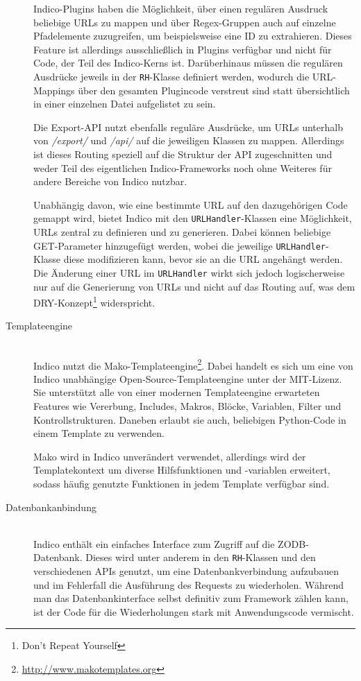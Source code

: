 \begin{description}
Indico-Plugins haben die Möglichkeit, über einen regulären Ausdruck beliebige URLs zu mappen und
über Regex-Gruppen auch auf einzelne Pfadelemente zuzugreifen, um beispielsweise eine ID zu
extrahieren. Dieses Feature ist allerdings ausschließlich in Plugins verfügbar und nicht für Code,
der Teil des Indico-Kerns ist. Darüberhinaus müssen die regulären Ausdrücke jeweils in der
\lstinline{RH}-Klasse definiert werden, wodurch die URL-Mappings über den gesamten Plugincode
verstreut sind statt übersichtlich in einer einzelnen Datei aufgelistet zu sein.

Die Export-API nutzt ebenfalls reguläre Ausdrücke, um URLs unterhalb von \emph{/export/} und
\emph{/api/} auf die jeweiligen Klassen zu mappen. Allerdings ist dieses Routing speziell auf die
Struktur der API zugeschnitten und weder Teil des eigentlichen Indico-Frameworks noch ohne Weiteres
für andere Bereiche von Indico nutzbar.

Unabhängig davon, wie eine bestimmte URL auf den dazugehörigen Code gemappt wird, bietet Indico mit
den \lstinline{URLHandler}-Klassen eine Möglichkeit, URLs zentral zu definieren und zu generieren.
Dabei können beliebige GET-Parameter hinzugefügt werden, wobei die jeweilige
\lstinline{URLHandler}-Klasse diese modifizieren kann, bevor sie an die URL angehängt werden. Die
Änderung einer URL im \lstinline{URLHandler} wirkt sich jedoch logischerweise nur auf die
Generierung von URLs und nicht auf das Routing auf, was dem DRY-Konzept\footnote{Don't Repeat
Yourself} widerspricht.


\item[Templateengine] \hfill \\
Indico nutzt die Mako-Templateengine\footnote{\href{http://www.makotemplates.org}{http://www.makotemplates.org}}.
Dabei handelt es sich um eine von Indico unabhängige Open-Source-Templateengine unter der
MIT-Lizenz. Sie unterstützt alle von einer modernen Templateengine erwarteten Features wie
Vererbung, Includes, Makros, Blöcke, Variablen, Filter und Kontrollstrukturen. Daneben erlaubt sie
auch, beliebigen Python-Code in einem Template zu verwenden.

Mako wird in Indico unverändert verwendet, allerdings wird der Templatekontext um diverse
Hilfsfunktionen und -variablen erweitert, sodass häufig genutzte Funktionen in jedem Template
verfügbar sind.




\item[Datenbankanbindung] \hfill \\
Indico enthält ein einfaches Interface zum Zugriff auf die ZODB-Datenbank. Dieses wird unter anderem
in den \lstinline{RH}-Klassen und den verschiedenen APIs genutzt, um eine Datenbankverbindung
aufzubauen und im Fehlerfall die Ausführung des Requests zu wiederholen. Während man das
Datenbankinterface selbst definitiv zum Framework zählen kann, ist der Code für die Wiederholungen
stark mit Anwendungscode vermischt.


\end{description}
